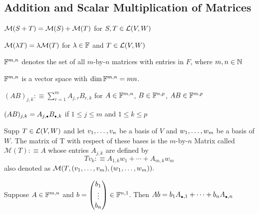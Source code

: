 \subsection{Addition and Scalar Multiplication of Matrices}
\setcounter{thm}{34}
\begin{thm}
    $\mathcal{M}(S+T) = \mathcal{M}(S) + \mathcal{M}(T)$ for $S, T \in \mathcal{L} (V,W)$
\end{thm}

\setcounter{thm}{37}
\begin{thm}
    $\mathcal{M}(\lambda T) = \lambda \mathcal{M}(T)$ for $\lambda \in \mathbb{F}$ and $T \in \mathcal{L} (V,W)$
\end{thm}

\begin{mydef}
    $\mathbb{F}^{m,n}$ denotes the set of all $m$-by-$n$ matrices with entries in $F$, where $m,n \in \mathbb{N}$
\end{mydef}

\begin{thm}
    $\mathbb{F}^{m,n}$ is a vector space with $\dim \mathbb{F}^{m,n}=mn$.
\end{thm}



\setcounter{thm}{40}

\begin{mydef}
    $(AB)_{j,k} :\equiv \sum_{r=1}^{m} A_{j,r} B_{r,k}$ for $A\in \mathbb{F}^{m,n}$, $B\in \mathbb{F}^{n,p}$, $AB \in \mathbb{F}^{m,p}$
\end{mydef}

\setcounter{thm}{45}
\begin{thm}
    $(AB)_{j,k} = A_{j, \mathsmaller{\bullet}} B_{\mathsmaller{\bullet}, k}$ if $1 \leq j \leq m$ and $1 \leq k \leq p$
\end{thm}

\setcounter{thm}{30}
\begin{thm}
    Supp $T \in {\mathcal{L}(V,W)}$ and let $v_1, \dots, v_n$ be a basis of $V$ and $w_1, \dots, w_m$ be a basis of $W$. The matrix of T with respect of these bases is the $m$-by-$n$ Matrix called $\mathcal{M}(T) :\equiv A$ whose entries $A_{j,k}$ are defined by
	\begin{equation}
		Tv_k :\equiv A_{1,k}w_1+\cdots+A_{m,k}w_m	
	\end{equation}
	also denoted as $\mathcal{M}(T,(v_1, \dots, v_m), (w_1, \dots, w_m)).$
\end{thm}

\setcounter{thm}{49}
\begin{thm}
    Suppose $A \in \mathbb{F}^{m,n}$ and $b=\left(\begin{matrix}b_1\\ \vdots \\ b_n \end{matrix}\right) \in \mathbb{F}^{n,1}$. Then $Ab = b_1 A_{\mathsmaller{\bullet}, 1} + \dots + b_n A_{\mathsmaller{\bullet},n}$ 
\end{thm}

